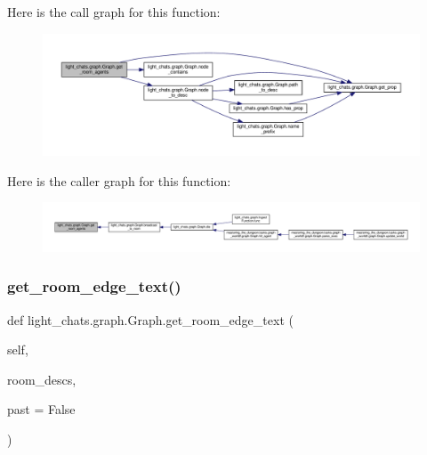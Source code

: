 Here is the call graph for this function\+:
\nopagebreak
\begin{figure}[H]
\begin{center}
\leavevmode
\includegraphics[width=350pt]{classlight__chats_1_1graph_1_1Graph_a6e638e9bda7cd6e0f6d964d02a22dec6_cgraph}
\end{center}
\end{figure}
Here is the caller graph for this function\+:
\nopagebreak
\begin{figure}[H]
\begin{center}
\leavevmode
\includegraphics[width=350pt]{classlight__chats_1_1graph_1_1Graph_a6e638e9bda7cd6e0f6d964d02a22dec6_icgraph}
\end{center}
\end{figure}
\mbox{\label{classlight__chats_1_1graph_1_1Graph_a2588a6f893b108eb25c9125db8036c0a}} 
\subsubsection{\texorpdfstring{get\+\_\+room\+\_\+edge\+\_\+text()}{get\_room\_edge\_text()}}
{\footnotesize\ttfamily def light\+\_\+chats.\+graph.\+Graph.\+get\+\_\+room\+\_\+edge\+\_\+text (\begin{DoxyParamCaption}\item[{}]{self,  }\item[{}]{room\+\_\+descs,  }\item[{}]{past = {\ttfamily False} }\end{DoxyParamCaption})}

